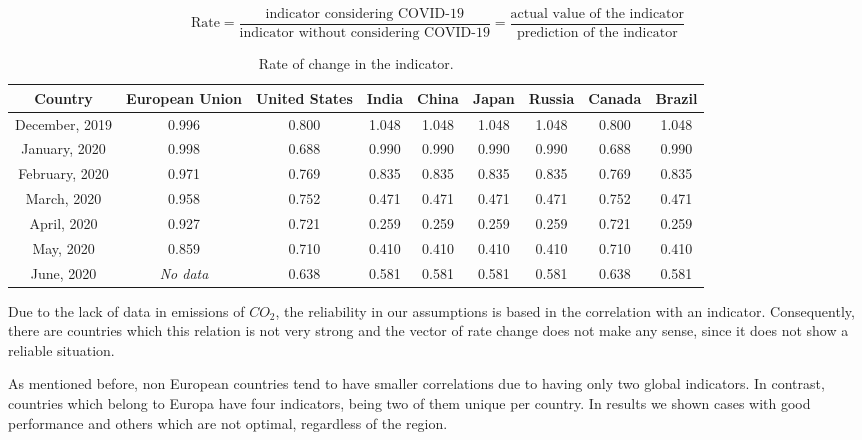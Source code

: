 \begin{equation}
\text{Rate} = \frac{\text{indicator considering COVID-19}}{\text{indicator without considering COVID-19}} = \frac{\text{actual value of the indicator}}{\text{prediction of the indicator}} 
\end{equation}
\begin{table}[h!]
	\centering
	\begin{tabular}{c|cccccccc}
		\hline
		Country & European Union & United States & India & China & Japan & Russia & Canada & Brazil \\ 
		\hline 
		December, 2019 & 0.996 & 0.800 & 1.048 & 1.048 & 1.048 & 1.048 & 0.800 & 1.048  \\
		January, 2020 & 0.998 & 0.688 & 0.990 & 0.990 & 0.990 & 0.990 & 0.688 & 0.990 \\
		February, 2020 & 0.971 & 0.769 & 0.835 & 0.835 & 0.835 & 0.835 & 0.769 & 0.835 \\
		March, 2020 & 0.958 & 0.752 & 0.471 & 0.471 & 0.471 & 0.471 & 0.752 & 0.471 \\
		April, 2020 & 0.927 & 0.721 & 0.259 & 0.259 & 0.259 & 0.259 & 0.721 & 0.259 \\
		May, 2020 & 0.859 & 0.710 & 0.410 & 0.410 & 0.410 & 0.410 & 0.710 & 0.410 \\
		June, 2020 & \textit{No data} & 0.638 & 0.581 & 0.581 & 0.581 & 0.581 & 0.638 & 0.581 \\
		\hline
	\end{tabular}
	\vspace{1em}
	\caption{Rate of change in the indicator.}
	\label{table:change}  
\end{table}

Due to the lack of data in emissions of $ CO_2 $, the reliability in our assumptions is based in the correlation with an indicator. Consequently, there are countries which this relation is not very strong and the vector of rate change does not make any sense, since it does not show a reliable situation. 

As mentioned before, non European countries tend to have smaller correlations due to having only two global indicators. In contrast, countries which belong to Europa have four indicators, being two of them unique per country. In results we shown cases with good performance and others which are not optimal, regardless of the region.




